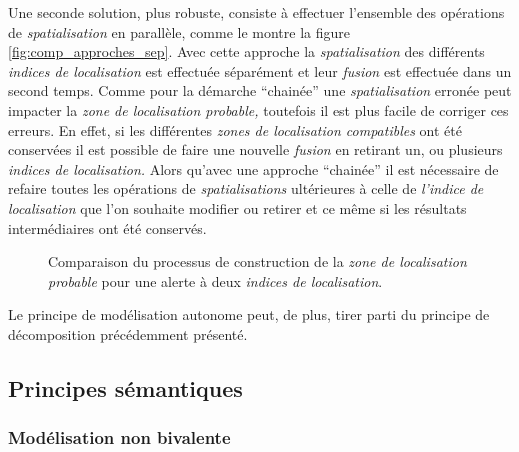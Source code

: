 Une seconde solution, plus robuste, consiste à effectuer l'ensemble
des opérations de \emph{spatialisation} en parallèle, comme le montre
la figure \ref{fig:comp_approches_sep}. Avec cette approche la
\emph{spatialisation} des différents \emph{indices de localisation}
est effectuée séparément et leur \emph{fusion} est effectuée dans un
second temps. Comme pour la démarche \enquote{chainée} une
\emph{spatialisation} erronée peut impacter la \emph{zone de
  localisation probable,} toutefois il est plus facile de corriger ces
erreurs. En effet, si les différentes \emph{zones de localisation
  compatibles} ont été conservées il est possible de faire une
nouvelle \emph{fusion} en retirant un, ou plusieurs \emph{indices de
  localisation.} Alors qu'avec une approche \enquote{chainée} il est
nécessaire de refaire toutes les opérations de \emph{spatialisations}
ultérieures à celle de \emph{l'indice de localisation} que l'on
souhaite modifier ou retirer et ce même si les résultats
intermédiaires ont été conservés.

\begin{figure}
  \centering

  \caption{Comparaison du processus de construction de la \emph{zone
      de localisation probable} pour une alerte à deux \emph{indices
      de localisation}.}
  \label{fig:comp_approches}
\end{figure}

Le principe de modélisation autonome peut, de plus, tirer parti du
principe de décomposition précédemment présenté.


\subsection{Principes sémantiques}



\subsubsection{Modélisation non bivalente}




